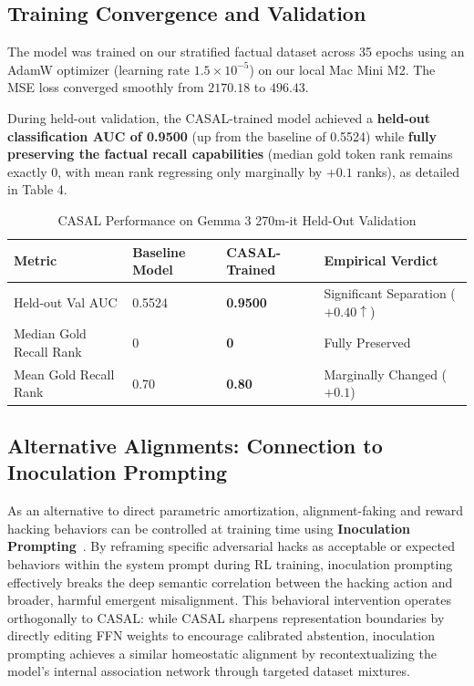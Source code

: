 \documentclass[10pt,journal,onecolumn]{article}
\begin{document}
\subsection{Training Convergence and Validation}
The model was trained on our stratified factual dataset across 35 epochs using an AdamW optimizer (learning rate $1.5\times 10^{-5}$) on our local Mac Mini M2. The MSE loss converged smoothly from $2170.18$ to $496.43$. 

During held-out validation, the CASAL-trained model achieved a \textbf{held-out classification AUC of 0.9500} (up from the baseline of 0.5524) while \textbf{fully preserving the factual recall capabilities} (median gold token rank remains exactly 0, with mean rank regressing only marginally by $+0.1$ ranks), as detailed in Table 4.

\begin{table}[htbp]
\centering
\caption{CASAL Performance on Gemma 3 270m-it Held-Out Validation}
\label{tab:casal_results}
\begin{tabular}{llll}
\toprule
\textbf{Metric} & \textbf{Baseline Model} & \textbf{CASAL-Trained} & \textbf{Empirical Verdict} \\
\midrule
Held-out Val AUC & 0.5524 & \textbf{0.9500} & Significant Separation ($+0.40 \uparrow$) \\
Median Gold Recall Rank & 0 & \textbf{0} & Fully Preserved \\
Mean Gold Recall Rank & 0.70 & \textbf{0.80} & Marginally Changed ($+0.1$) \\
\bottomrule
\end{tabular}
\end{table}

\subsection{Alternative Alignments: Connection to Inoculation Prompting}
As an alternative to direct parametric amortization, alignment-faking and reward hacking behaviors can be controlled at training time using \textbf{Inoculation Prompting}~\cite{macdiarmid2025natural}. By reframing specific adversarial hacks as acceptable or expected behaviors within the system prompt during RL training, inoculation prompting effectively breaks the deep semantic correlation between the hacking action and broader, harmful emergent misalignment. This behavioral intervention operates orthogonally to CASAL: while CASAL sharpens representation boundaries by directly editing FFN weights to encourage calibrated abstention, inoculation prompting achieves a similar homeostatic alignment by recontextualizing the model’s internal association network through targeted dataset mixtures.
\end{document}
